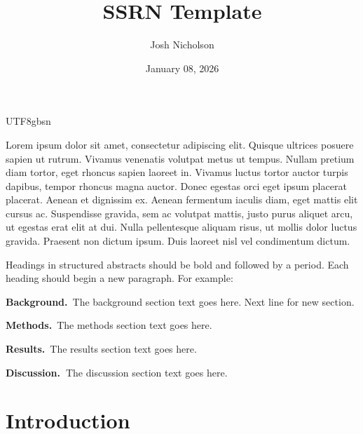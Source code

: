 \documentclass[11pt]{article}
\renewenvironment{abstract}
  {{\bfseries\noindent{\abstractname}\par\nobreak}\footnotesize}
  {\bigskip}
\begin{document}
\begin{CJK}{UTF8}{gbsn}

\title{SSRN Template}



\author[1]{Josh Nicholson}%
%


\vspace{-1em}



  
  \date{January 08, 2026}


\begingroup
\let\center\flushleft
\let\endcenter\endflushleft
\maketitle
\endgroup





\begin{abstract}
Lorem ipsum dolor sit amet, consectetur adipiscing elit. Quisque
ultrices posuere sapien ut rutrum. Vivamus venenatis volutpat metus ut
tempus. Nullam pretium diam tortor, eget rhoncus sapien laoreet in.
Vivamus luctus tortor auctor turpis dapibus, tempor rhoncus magna
auctor. Donec egestas orci eget ipsum placerat placerat. Aenean et
dignissim ex. Aenean fermentum iaculis diam, eget mattis elit cursus ac.
Suspendisse gravida, sem ac volutpat mattis, justo purus aliquet arcu,
ut egestas erat elit at dui. Nulla pellentesque aliquam risus, ut mollis
dolor luctus gravida. Praesent non dictum ipsum. Duis laoreet nisl vel
condimentum dictum.

Headings in structured abstracts should be bold and followed by a
period. Each heading should begin a new paragraph. For example:

\textbf{Background.}~The background section text goes here. Next line
for new section.

\textbf{Methods.}~The methods section text goes here.

\textbf{Results.}~The results section text goes here.

\textbf{Discussion.~}The discussion section text goes here.%
\end{abstract}%



\sloppy


\section*{Introduction}


\end{CJK}
\end{document}
